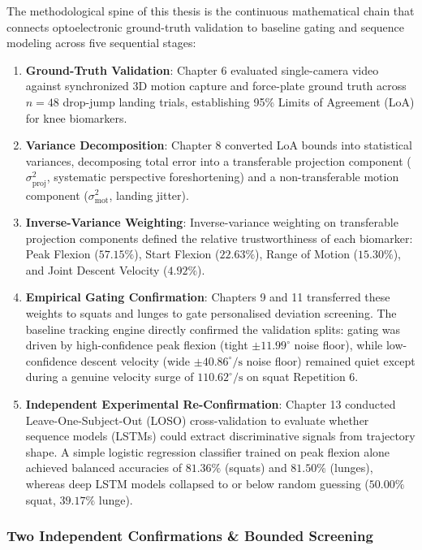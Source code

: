 The methodological spine of this thesis is the continuous mathematical chain that connects optoelectronic ground-truth validation to baseline gating and sequence modeling across five sequential stages:
\begin{enumerate}
  \item \textbf{Ground-Truth Validation}: Chapter 6 evaluated single-camera video against synchronized 3D motion capture and force-plate ground truth across $n = 48$ drop-jump landing trials, establishing 95\% Limits of Agreement (LoA) for knee biomarkers.
  \item \textbf{Variance Decomposition}: Chapter 8 converted LoA bounds into statistical variances, decomposing total error into a transferable projection component ($\sigma^2_{\text{proj}}$, systematic perspective foreshortening) and a non-transferable motion component ($\sigma^2_{\text{mot}}$, landing jitter).
  \item \textbf{Inverse-Variance Weighting}: Inverse-variance weighting on transferable projection components defined the relative trustworthiness of each biomarker: Peak Flexion ($57.15\%$), Start Flexion ($22.63\%$), Range of Motion ($15.30\%$), and Joint Descent Velocity ($4.92\%$).
  \item \textbf{Empirical Gating Confirmation}: Chapters 9 and 11 transferred these weights to squats and lunges to gate personalised deviation screening. The baseline tracking engine directly confirmed the validation splits: gating was driven by high-confidence peak flexion (tight $\pm 11.99^\circ$ noise floor), while low-confidence descent velocity (wide $\pm 40.86^\circ/\text{s}$ noise floor) remained quiet except during a genuine velocity surge of $110.62^\circ/\text{s}$ on squat Repetition 6.
  \item \textbf{Independent Experimental Re-Confirmation}: Chapter 13 conducted Leave-One-Subject-Out (LOSO) cross-validation to evaluate whether sequence models (LSTMs) could extract discriminative signals from trajectory shape. A simple logistic regression classifier trained on peak flexion alone achieved balanced accuracies of \textbf{$81.36\%$} (squats) and \textbf{$81.50\%$} (lunges), whereas deep LSTM models collapsed to or below random guessing ($50.00\%$ squat, $39.17\%$ lunge).
\end{enumerate}

\subsubsection{Two Independent Confirmations \& Bounded Screening}
\label{sec:two-independent-confirmations-bounded-screening}

